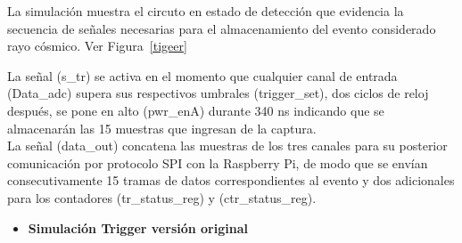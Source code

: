La simulación muestra el circuto en estado de detección que evidencia la secuencia de señales necesarias para el almacenamiento del evento considerado rayo cósmico. Ver Figura~\ref{tigeer}

La señal (s\_tr) se activa en el momento que cualquier canal de entrada (Data\_adc) supera sus respectivos umbrales (trigger\_set), dos ciclos de reloj después, se pone en alto (pwr\_enA) durante 340 ns indicando que se almacenarán las 15 muestras que ingresan de la captura.\\
La señal (data\_out) concatena las muestras de los tres canales para su posterior comunicación por protocolo SPI con la Raspberry Pi, de modo que se envían consecutivamente 15 tramas de datos correspondientes al evento y dos adicionales para los contadores (tr\_status\_reg) y (ctr\_status\_reg).






\begin{itemize}
    \item {\textbf{Simulación Trigger versión original}}
    
\end{itemize}

